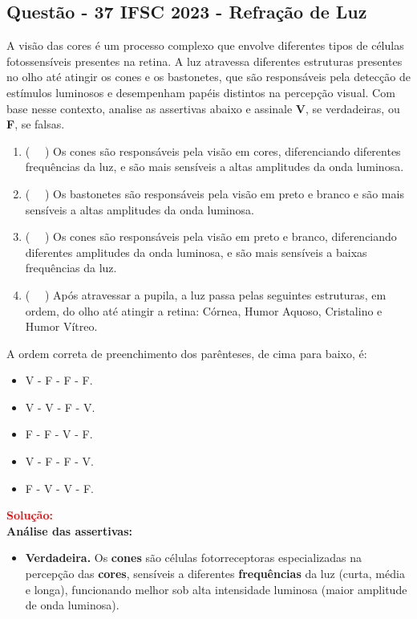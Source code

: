 \begin{flushleft}
\subsection{Quest\~ao - 37 IFSC 2023 - Refração de Luz}
A vis\~ao das cores \'e um processo complexo que envolve diferentes tipos de c\'elulas fotossens\'iveis presentes na retina. 
A luz atravessa diferentes estruturas presentes no olho at\'e atingir os cones e os bastonetes, que s\~ao respons\'aveis pela 
detec\c{c}\~ao de est\'imulos luminosos e desempenham pap\'eis distintos na percep\c{c}\~ao visual. Com base nesse contexto, 
analise as assertivas abaixo e assinale \textbf{V}, se verdadeiras, ou \textbf{F}, se falsas.

\begin{enumerate}
\item ( \ \ ) Os cones s\~ao respons\'aveis pela vis\~ao em cores, diferenciando diferentes frequ\^encias da luz, e s\~ao mais sens\'iveis a 
altas amplitudes da onda luminosa.
\item ( \ \ ) Os bastonetes s\~ao respons\'aveis pela vis\~ao em preto e branco e s\~ao mais sens\'iveis a altas amplitudes da onda luminosa.
\item ( \ \ ) Os cones s\~ao respons\'aveis pela vis\~ao em preto e branco, diferenciando diferentes amplitudes da onda luminosa, e s\~ao mais 
sens\'iveis a baixas frequ\^encias da luz.
\item ( \ \ ) Ap\'os atravessar a pupila, a luz passa pelas seguintes estruturas, em ordem, do olho at\'e atingir a retina: C\'ornea, Humor 
Aquoso, Cristalino e Humor V\'itreo.
\end{enumerate}

A ordem correta de preenchimento dos par\^enteses, de cima para baixo, \'e:
\begin{itemize}
\item[(A)] V - F - F - F.
\item[(B)] V - V - F - V.
\item[(C)] F - F - V - F.
\item[(D)] V - F - F - V.
\item[(E)] F - V - V - F.
\end{itemize}

\vspace{0.5cm}

\textcolor{red}{\textbf{Solução:}}\\

\textbf{Análise das assertivas:}
\begin{itemize}
    \item[(1)] \textbf{Verdadeira.} Os \textbf{cones} s\~ao c\'elulas fotorreceptoras especializadas na percep\c{c}\~ao das \textbf{cores}, sens\'iveis a diferentes \textbf{frequ\^encias} da luz (curta, m\'edia e longa), funcionando melhor sob alta intensidade luminosa (maior amplitude de onda luminosa).
    

\end{itemize}
\end{flushleft}
